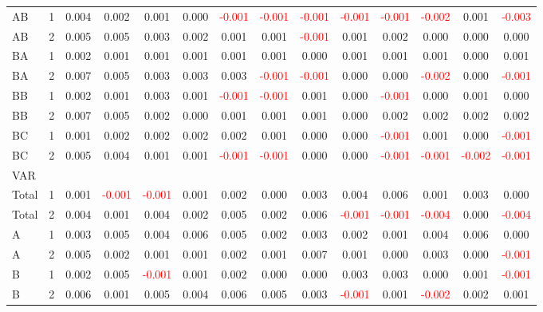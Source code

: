 \begin{table}[H]
{\begin{tabular}{llcccccccccccc}
AB & 1 & 0.004 & 0.002 & 0.001 & 0.000 & \textcolor{red}{-0.001} & \textcolor{red}{-0.001} & \textcolor{red}{-0.001} & \textcolor{red}{-0.001} & \textcolor{red}{-0.001} & \textcolor{red}{-0.002} & 0.001 & \textcolor{red}{-0.003}\\
AB & 2 & 0.005 & 0.005 & 0.003 & 0.002 & 0.001 & 0.001 & \textcolor{red}{-0.001} & 0.001 & 0.002 & 0.000 & 0.000 & 0.000\\
BA & 1 & 0.002 & 0.001 & 0.001 & 0.001 & 0.001 & 0.001 & 0.000 & 0.001 & 0.001 & 0.001 & 0.000 & 0.001\\
BA & 2 & 0.007 & 0.005 & 0.003 & 0.003 & 0.003 & \textcolor{red}{-0.001} & \textcolor{red}{-0.001} & 0.000 & 0.000 & \textcolor{red}{-0.002} & 0.000 & \textcolor{red}{-0.001}\\
BB & 1 & 0.002 & 0.001 & 0.003 & 0.001 & \textcolor{red}{-0.001} & \textcolor{red}{-0.001} & 0.001 & 0.000 & \textcolor{red}{-0.001} & 0.000 & 0.001 & 0.000\\
BB & 2 & 0.007 & 0.005 & 0.002 & 0.000 & 0.001 & 0.001 & 0.001 & 0.000 & 0.002 & 0.002 & 0.002 & 0.002\\
BC & 1 & 0.001 & 0.002 & 0.002 & 0.002 & 0.002 & 0.001 & 0.000 & 0.000 & \textcolor{red}{-0.001} & 0.001 & 0.000 & \textcolor{red}{-0.001}\\
BC & 2 & 0.005 & 0.004 & 0.001 & 0.001 & \textcolor{red}{-0.001} & \textcolor{red}{-0.001} & 0.000 & 0.000 & \textcolor{red}{-0.001} & \textcolor{red}{-0.001} & \textcolor{red}{-0.002} & \textcolor{red}{-0.001}\\
\hline
VAR &  &  &  &  &  &  &  &  &  &  &  &  & \\
\hline
Total & 1 & 0.001 & \textcolor{red}{-0.001} & \textcolor{red}{-0.001} & 0.001 & 0.002 & 0.000 & 0.003 & 0.004 & 0.006 & 0.001 & 0.003 & 0.000\\
Total & 2 & 0.004 & 0.001 & 0.004 & 0.002 & 0.005 & 0.002 & 0.006 & \textcolor{red}{-0.001} & \textcolor{red}{-0.001} & \textcolor{red}{-0.004} & 0.000 & \textcolor{red}{-0.004}\\
A & 1 & 0.003 & 0.005 & 0.004 & 0.006 & 0.005 & 0.002 & 0.003 & 0.002 & 0.001 & 0.004 & 0.006 & 0.000\\
A & 2 & 0.005 & 0.002 & 0.001 & 0.001 & 0.002 & 0.001 & 0.007 & 0.001 & 0.000 & 0.003 & 0.000 & \textcolor{red}{-0.001}\\
B & 1 & 0.002 & 0.005 & \textcolor{red}{-0.001} & 0.001 & 0.002 & 0.000 & 0.000 & 0.003 & 0.003 & 0.000 & 0.001 & \textcolor{red}{-0.001}\\
B & 2 & 0.006 & 0.001 & 0.005 & 0.004 & 0.006 & 0.005 & 0.003 & \textcolor{red}{-0.001} & 0.001 & \textcolor{red}{-0.002} & 0.002 & 0.001\\

\end{tabular}}
\end{table}
